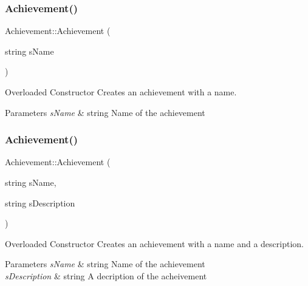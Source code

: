 \subsubsection{\texorpdfstring{Achievement()}{Achievement()}\hspace{0.1cm}{\footnotesize\ttfamily [1/3]}}
{\footnotesize\ttfamily Achievement\+::\+Achievement (\begin{DoxyParamCaption}\item[{string}]{s\+Name }\end{DoxyParamCaption})}



Overloaded Constructor Creates an achievement with a name. 


\begin{DoxyParams}{Parameters}
{\em s\+Name} & string Name of the achievement \\
\hline
\end{DoxyParams}
\hypertarget{class_achievement_ac3d729e601b49f195f671e93422159f5}{}\label{class_achievement_ac3d729e601b49f195f671e93422159f5} 
\subsubsection{\texorpdfstring{Achievement()}{Achievement()}\hspace{0.1cm}{\footnotesize\ttfamily [2/3]}}
{\footnotesize\ttfamily Achievement\+::\+Achievement (\begin{DoxyParamCaption}\item[{string}]{s\+Name,  }\item[{string}]{s\+Description }\end{DoxyParamCaption})}



Overloaded Constructor Creates an achievement with a name and a description. 


\begin{DoxyParams}{Parameters}
{\em s\+Name} & string Name of the achievement \\
\hline
{\em s\+Description} & string A decription of the acheivement \\
\hline
\end{DoxyParams}
\hypertarget{class_achievement_a83be456772eb1bb65ba8414111b34040}{}\label{class_achievement_a83be456772eb1bb65ba8414111b34040} 
